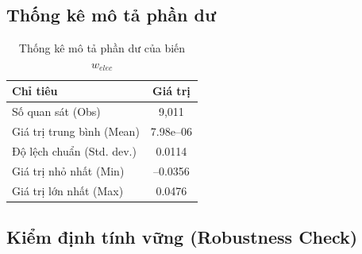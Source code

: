 \documentclass[12pt,a4paper,oneside]{article}
\begin{document}
\subsection{Thống kê mô tả phần dư}
\begin{table}[H]
	\centering
	\caption{Thống kê mô tả phần dư của biến $w_{elec}$}
	\begin{tabular}{l c}
		\toprule
		Chỉ tiêu & Giá trị \\
		\midrule
		Số quan sát (Obs) & 9,011 \\
		Giá trị trung bình (Mean) & 7.98e–06 \\
		Độ lệch chuẩn (Std. dev.) & 0.0114 \\
		Giá trị nhỏ nhất (Min) & –0.0356 \\
		Giá trị lớn nhất (Max) & 0.0476 \\
		\bottomrule
	\end{tabular}
\end{table}

\subsection{ Kiểm định tính vững (Robustness Check)}
\end{document}
